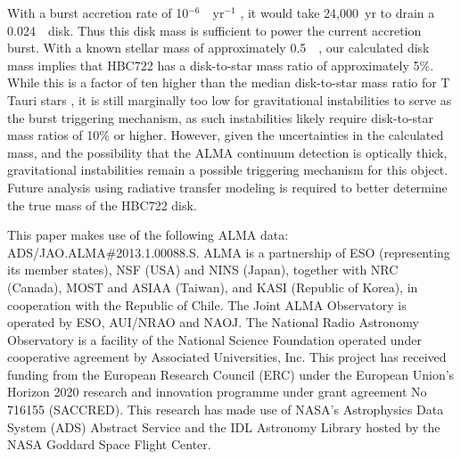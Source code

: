 \documentclass{aastex63}
\begin{document}
With a burst accretion rate of 10$^{-6}$~\msun~yr$^{-1}$ \citep{kospal2011:hbc722}, it would take 24,000~yr to drain a 0.024~\msun\ disk.  Thus this disk mass is sufficient to power the current accretion burst.  With a known stellar mass of approximately 0.5~\msun\ \citep{cohen1979:hbc722}, our calculated disk mass implies that HBC722 has a disk-to-star mass ratio of approximately 5\%.  While this is a factor of ten higher than the median disk-to-star mass ratio for T Tauri stars \citep{andrews2005:disks}, it is still marginally too low for gravitational instabilities to serve as the burst triggering mechanism, as such instabilities likely require disk-to-star mass ratios of 10\% or higher.  However, given the uncertainties in the calculated mass, and the possibility that the ALMA continuum detection is optically thick, gravitational instabilities remain a possible triggering mechanism for this object.  
Future analysis using radiative transfer modeling is required to better determine the true mass of the HBC722 disk.

\acknowledgments
This paper makes use of the following ALMA data: ADS/JAO.ALMA\#2013.1.00088.S. ALMA is a partnership of ESO (representing its member states), NSF (USA) and NINS (Japan), together with NRC (Canada), MOST and ASIAA (Taiwan), and KASI (Republic of Korea), in cooperation with the Republic of Chile. The Joint ALMA Observatory is operated by ESO, AUI/NRAO and NAOJ.  The National Radio Astronomy Observatory is a facility of the National Science Foundation operated under cooperative agreement by Associated Universities, Inc.  This project has received funding from the European Research Council (ERC) under the European Union's Horizon 2020 research and innovation programme under grant agreement No 716155 (SACCRED).  This research has made use of NASA's Astrophysics Data System (ADS) Abstract Service and the IDL Astronomy Library hosted by the NASA Goddard Space Flight Center.  




\end{document}
